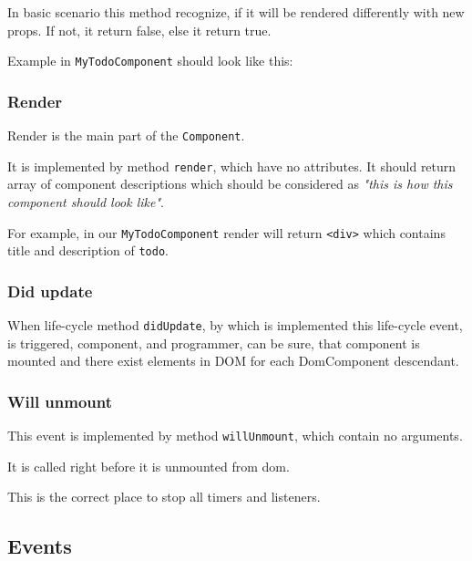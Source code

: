       In basic scenario this method recognize, 
      if it will be rendered differently with new props.  
      If not, it return false, else it return true.

      Example in \texttt{MyTodoComponent} should look like this:
      

    \subsubsection{Render}\label{subsec:our-architecture-lifecycle-render}

      Render is the main part of the \texttt{Component}. 

      It is implemented by method \texttt{render}, which have no attributes.
      It should return array of component descriptions which should be considered as 
      \textit{"this is how this component should look like"}.

      For example, in our \texttt{MyTodoComponent} render will return \texttt{<div>} which contains title and description of \texttt{todo}.
      

    \subsubsection{Did update}\label{subsec:our-architecture-lifecycle-didupdate}

      When life-cycle method \texttt{didUpdate}, 
      by which is implemented this life-cycle event, 
      is triggered, component, and programmer, can be sure, 
      that component is mounted and there exist elements in DOM for each DomComponent descendant.

    \subsubsection{Will unmount}\label{subsec:our-architecture-lifecycle-willunmount}

      This event is implemented by method \texttt{willUnmount}, which contain no arguments.
      
      It is called right before it is unmounted from dom. 

      This is the correct place to stop all timers and listeners.
      

  \subsection{Events}\label{subsec:our-architecture-events}

